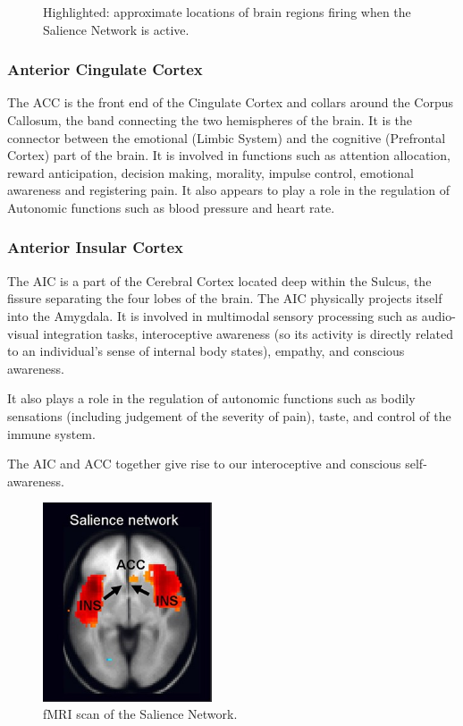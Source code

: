 \documentclass[a4paper, amsfonts, amssymb, amsmath, reprint, showkeys, nofootinbib, twoside]{revtex4-1}
\begin{document}
\begin{figure}[h!]
\begin{subfigure}[b]{0.48\linewidth}
  \end{subfigure}
  \caption{Highlighted: approximate locations of brain regions firing when the Salience Network is active.}
  \label{fig:sn}
\end{figure}


\subsubsection{Anterior Cingulate Cortex}

The ACC is the front end of the Cingulate Cortex and collars around the Corpus
Callosum, the band connecting the two hemispheres of the brain. It is the connector
between the emotional (Limbic System) and the cognitive (Prefrontal Cortex) part of
the brain. It is involved in functions such as attention allocation, reward
anticipation, decision making, morality, impulse control, emotional awareness and
registering pain. \cite{accstroop,accreward,snmorality,empathypain,acccognitive} It
also appears to play a role in the regulation of Autonomic functions such as blood
pressure and heart rate. \cite{accbloodpressure}

\subsubsection{Anterior Insular Cortex}

The AIC is a part of the Cerebral Cortex located deep within the Sulcus, the
fissure separating the four lobes of the brain. The AIC physically projects itself
into the Amygdala. It is involved in multimodal sensory processing such as
audio-visual integration tasks, interoceptive awareness (so its activity is directly
related to an individual's sense of internal body states), empathy, and conscious
awareness. \cite{aicemotion}

It also plays a role in the regulation of autonomic functions such as bodily
sensations (including judgement of the severity of pain), taste, and control of the
immune system. \cite{aicautonomic}

The AIC and ACC together give rise to our interoceptive and conscious
self-awareness.  \cite{selfaware}

\begin{figure}[H]
  \centering
  \includegraphics[width=5cm]{images/fmri-sn.jpg}
  \caption{fMRI scan of the Salience Network.}
  \label{fig:fmri-sn}
\end{figure}
\end{document}
